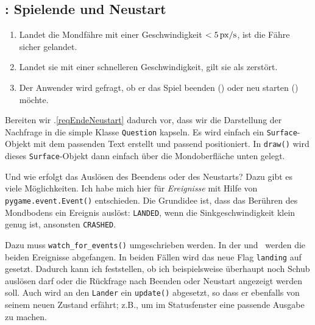 \subsection{: Spielende und Neustart}

	\begin{enumerate}
		\item Landet die Mondfähre mit einer Geschwindigkeit $<\unit[5]{px/s}$, ist die Fähre sicher gelandet.\label{reqEndeGewonnen}
		\item Landet sie mit einer schnelleren Geschwindigkeit, gilt sie als zerstört.\label{reqEndeVerloren}
		\item Der Anwender wird gefragt, ob er das Spiel beenden () oder neu starten () möchte.\label{reqEndeNeustart}
\end{enumerate}
\er


Bereiten wir .\ref{reqEndeNeustart} dadurch vor, dass wir die Darstellung der Nachfrage in die simple Klasse \texttt{Question} kapseln. Es wird einfach ein \texttt{Surface}-Objekt mit dem passenden Text erstellt und passend positioniert. In \texttt{draw()} wird dieses \texttt{Surface}-Objekt dann einfach über die Mondoberfläche unten gelegt.

\newpage
{} 

Und wie erfolgt das Auslösen des Beendens oder des Neustarts? Dazu gibt es viele Möglichkeiten. Ich habe mich hier für \emph{Ereignisse} mit Hilfe von  \texttt{pygame.event.Event()} entschieden. Die Grundidee ist, dass das Berühren des Mondbodens ein Ereignis auslöst: \texttt{LANDED}, wenn die Sinkgeschwindigkeit klein genug ist, ansonsten \texttt{CRASHED}. 



Dazu muss \texttt{watch\_for\_events()} umgeschrieben werden. In der  und~ werden die beiden Ereignisse abgefangen. In beiden Fällen wird das neue Flag \texttt{landing} auf \false{} gesetzt. Dadurch kann ich feststellen, ob ich beispielsweise überhaupt noch Schub auslösen darf oder die Rückfrage nach Beenden oder Neustart angezeigt werden soll. Auch wird an den \texttt{Lander} ein \texttt{update()} abgesetzt, so dass er ebenfalls von seinem neuen Zustand erfährt; z.B., um im Statusfenster eine passende Ausgabe zu machen.

